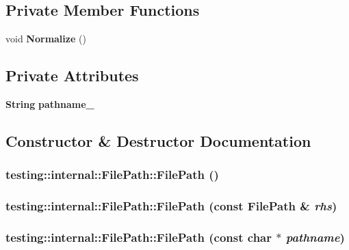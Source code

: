 \subsection*{Private Member Functions}
\begin{CompactItemize}
\item 
void {\bf Normalize} ()
\end{CompactItemize}
\subsection*{Private Attributes}
\begin{CompactItemize}
\item 
{\bf String} {\bf pathname\_\-}
\end{CompactItemize}


\subsection{Constructor \& Destructor Documentation}
\subsubsection{\setlength{\rightskip}{0pt plus 5cm}testing::internal::FilePath::FilePath ()\hspace{0.3cm}{\tt  [inline]}}\label{classtesting_1_1internal_1_1FilePath_cdb606cae6ec2709a1559fd247e5c162}


\subsubsection{\setlength{\rightskip}{0pt plus 5cm}testing::internal::FilePath::FilePath (const {\bf FilePath} \& {\em rhs})\hspace{0.3cm}{\tt  [inline]}}\label{classtesting_1_1internal_1_1FilePath_d7a74f993a6d42abaf0a6b3404038cb4}


\subsubsection{\setlength{\rightskip}{0pt plus 5cm}testing::internal::FilePath::FilePath (const char $\ast$ {\em pathname})\hspace{0.3cm}{\tt  [inline, explicit]}}\label{classtesting_1_1internal_1_1FilePath_9ec00e94b94c757aa045b576b5c4de02}


